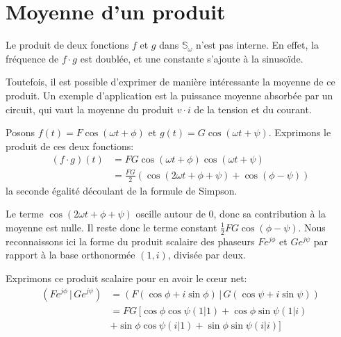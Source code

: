 \section{Moyenne d'un produit}

Le produit de deux fonctions $f$ et $g$ dans $\mathbb{S}_\omega$
n'est pas interne.
En effet, la fréquence de $f \cdot g$ est doublée,
et une constante s'ajoute à la sinusoïde.

Toutefois, il est possible d'exprimer de manière intéressante
la moyenne de ce produit.
Un exemple d'application est la puissance moyenne absorbée par un circuit,
qui vaut la moyenne du produit $v\cdot i$ de la tension et du courant.

Posons $f(t) = F\cos(\omega t + \phi)$ et $g(t) = G\cos(\omega t + \psi)$.
Exprimons le produit de ces deux fonctions:
\begin{equation}
    \begin{split}
        (f\cdot g)(t) &= FG\cos(\omega t + \phi)\cos(\omega t + \psi) \\
        &= \frac{FG}{2}(\cos(2\omega t + \phi + \psi) + \cos(\phi - \psi))
    \end{split}
\end{equation}
la seconde égalité découlant de la formule de Simpson.

Le terme $\cos(2\omega t + \phi + \psi)$ oscille autour de 0,
donc sa contribution à la moyenne est nulle.
Il reste donc le terme constant $\frac{1}{2}FG\cos(\phi - \psi)$.
Nous reconnaissons ici la forme du produit scalaire des phaseurs
$Fe^{j\phi}$ et $Ge^{j\psi}$ par rapport à la base orthonormée $(1,i)$,
divisée par deux.

Exprimons ce produit scalaire pour en avoir le cœur net:
\begin{equation}
    \begin{split}
        (Fe^{j\phi} \,|\, Ge^{j\psi})
        &= (F(\cos\phi+i\sin\phi) \,|\, G(\cos\psi+i\sin\psi)) \\
        &= FG\,\big[\cos\phi\cos\psi(1|1) + \cos\phi\sin\psi(1|i) \\
        &+ \sin\phi\cos\psi(i|1) + \sin\phi\sin\psi(i|i)\big]
    \end{split}
\end{equation}
